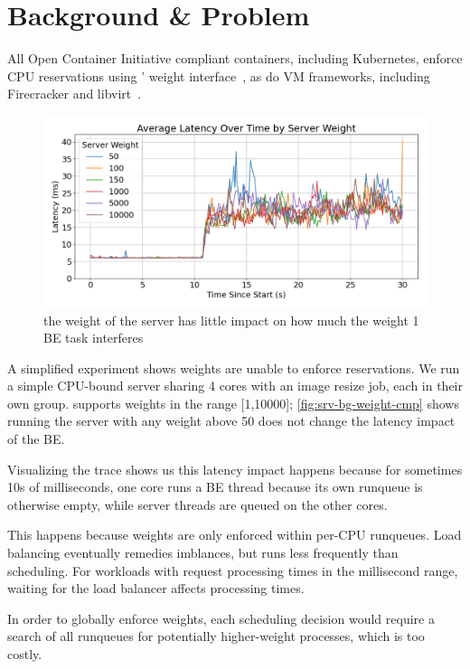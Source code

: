 
\section{Background \& Problem}

All Open Container Initiative compliant containers, including Kubernetes,
enforce CPU reservations using \cgroups{}' weight interface~\cite{oci-cgroups,
docker-docs-cgroups, container-isolation-article}, as do VM frameworks,
including Firecracker and
libvirt~\cite{firecracker-cgroups,afaas,libvirt-cgroups}. 

\begin{figure}[t]
    \centering
    \includegraphics[width=\columnwidth]{graphs/srv-bg-weight-cmp-low.png}
    \caption{ the weight of the server has little impact on how much the
    weight 1 BE task interferes }\label{fig:srv-bg-weight-cmp}
\end{figure}


A simplified experiment shows \cgroups{} weights are unable to enforce
reservations. We run a simple CPU-bound server sharing 4 cores with an image
resize job, each in their own group. \cgroups{} supports weights in the range
[1,10000]; \autoref{fig:srv-bg-weight-cmp} shows running the server with any
weight above 50 does not change the latency impact of the BE.

Visualizing the trace shows us this latency impact happens because for sometimes
10s of milliseconds, one core runs a BE thread because its own runqueue is
otherwise empty, while server threads are queued on the other cores.

This happens because weights are only enforced within per-CPU runqueues. Load
balancing eventually remedies imblances, but runs less frequently than
scheduling. For workloads with request processing times in the millisecond
range, waiting for the load balancer affects processing times.

In order to globally enforce weights, each scheduling decision would require a
search of all runqueues for potentially higher-weight processes, which is too
costly. 




